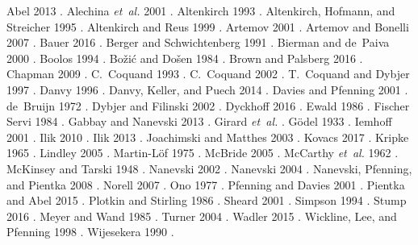 \documentclass{entcs}
\renewcommand{\:}{\mathrel{:}}
\renewcommand{\;}{\mathbin{;}}
\begin{document}
Abel 2013 \cite{Abel2013}.
Alechina \emph{et~al.} 2001 \cite{AlechinaMPR2001}.
Altenkirch 1993 \cite{Altenkirch1993}.
Altenkirch, Hofmann, and Streicher 1995 \cite{AltenkirchHS1995}.
Altenkirch and Reus 1999 \cite{AltenkirchR1999}.
Artemov 2001 \cite{Artemov2001}.
Artemov and Bonelli 2007 \cite{ArtemovB2007}.
Bauer 2016 \cite{Bauer2016}.
Berger and Schwichtenberg 1991 \cite{BergerS1991}.
Bierman and de~Paiva 2000 \cite{BiermanP2000}.
Boolos 1994 \cite{Boolos1994}.
Bo\v{z}i\'{c} and Do\v{s}en 1984 \cite{BozicD1984}.
Brown and Palsberg 2016 \cite{BrownP2016}.
Chapman 2009 \cite{Chapman2009}.
C.~Coquand 1993 \cite{Coquand1993}.
C.~Coquand 2002 \cite{Coquand2002}.
T.~Coquand and Dybjer 1997 \cite{CoquandD1997}.
Danvy 1996 \cite{Danvy1996}.
Danvy, Keller, and Puech 2014 \cite{DanvyKP2014}.
Davies and Pfenning 2001 \cite{DaviesP2001}.
de~Bruijn 1972 \cite{DeBruijn1972}.
Dybjer and Filinski 2002 \cite{DybjerF2002}.
Dyckhoff 2016 \cite{Dyckhoff2016}.
Ewald 1986 \cite{Ewald1986}.
Fischer Servi 1984 \cite{FischerServi1984}.
Gabbay and Nanevski 2013 \cite{GabbayN2013}.
Girard \emph{et~al.} \cite{GirardTL1989}.
G\"{o}del 1933 \cite{Goedel1933}.
Iemhoff 2001 \cite{Iemhoff2001}.
Ilik 2010 \cite{Ilik2010}.
Ilik 2013 \cite{Ilik2013}.
Joachimski and Matthes 2003 \cite{JoachimskiM2003}.
Kovacs 2017 \cite{Kovacs2017}.
Kripke 1965 \cite{Kripke1965}.
Lindley 2005 \cite{Lindley2005}.
Martin-L\"{o}f 1975 \cite{MartinLoef1975}.
McBride 2005 \cite{McBride2005}.
McCarthy \emph{et~al.} 1962 \cite{McCarthyAEHL1962}.
McKinsey and Tarski 1948 \cite{McKinseyT1948}.
Nanevski 2002 \cite{Nanevski2002}.
Nanevski 2004 \cite{Nanevski2004}.
Nanevski, Pfenning, and Pientka 2008 \cite{NanevskiPP2008}.
Norell 2007 \cite{Norell2007}.
Ono 1977 \cite{Ono1977}.
Pfenning and Davies 2001 \cite{PfenningD2001}.
Pientka and Abel 2015 \cite{PientkaA2015}.
Plotkin and Stirling 1986 \cite{PlotkinS1986}.
Sheard 2001 \cite{Sheard2001}.
Simpson 1994 \cite{Simpson1994}.
Stump 2016 \cite{Stump2016}.
Meyer and Wand 1985 \cite{MeyerW1985}.
Turner 2004 \cite{Turner2004}.
Wadler 2015 \cite{Wadler2015}.
Wickline, Lee, and Pfenning 1998 \cite{WicklineLP1998}.
Wijesekera 1990 \cite{Wijesekera1990}.




\end{document}
